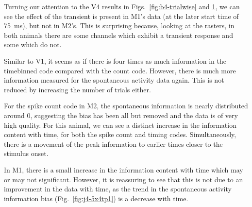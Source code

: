 \begin{figure}[htbp]
{%
}
    \label{fig:j4-trialwise}
\end{figure}



Turning our attention to the \ac{V4} results in Figs.~\ref{fig:b4-trialwise} and \ref{fig:j4-trialwise}, we can see the effect of the transient is present in \ac{M1}'s data (at the later start time of \SI{75}{ms}), but not in \ac{M2}'s.
This is surprising because, looking at the rasters, in both animals there are some channels which exhibit a transient response and some which do not.

Similar to \ac{V1}, it seems as if there is four times as much information in the timebinned code compared with the count code.
However, there is much more information measured for the spontaneous activity data again.
This is not reduced by increasing the number of trials either.

For the spike count code in \ac{M2}, the spontaneous information is nearly distributed around 0, suggesting the bias has been all but removed and the data is of very high quality.
For this animal, we can see a distinct increase in the information content with time, for both the spike count and timing codes.
Simultaneously, there is a movement of the peak information to earlier times closer to the stimulus onset.

In \ac{M1}, there is a small increase in the information content with time which may or may not significant.
However, it is reassuring to see that this is not due to an improvement in the data with time, as the trend in the spontaneous activity information bias (Fig.~\ref{fig:j4-5x4tp1}) is a decrease with time.


